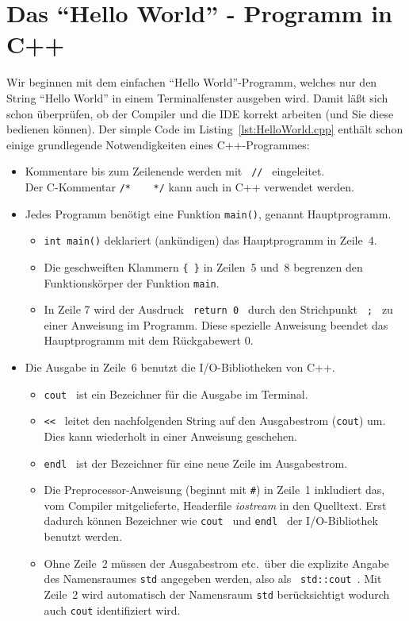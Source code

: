\section{Das ``Hello World'' - Programm in C++}
\label{p:1.2}
%
Wir beginnen mit dem einfachen ``Hello World''-Programm, welches
nur den String ``Hello World'' in einem Terminalfenster ausgeben wird. Damit läßt sich
schon überprüfen, ob der Compiler und die IDE korrekt arbeiten
(und Sie diese bedienen können).
%
%
Der simple Code im Listing~\ref{lst:HelloWorld.cpp} enthält schon einige
grundlegende Notwendigkeiten eines C++-Programmes:
%
\begin{itemize}
  \item Kommentare bis zum Zeilenende werden mit \verb| // | eingeleitet.
  \\
  Der C-Kommentar \verb|/*    */| kann auch in C++ verwendet werden.
  \item Jedes Programm benötigt eine Funktion \verb|main()|, genannt Hauptprogramm.
  \begin{itemize}
	  \item \verb|int main()|  deklariert (ankündigen) das Hauptprogramm in Zeile~4.
	  \item Die geschweiften Klammern \verb|{ }| in Zeilen~5 und~8 begrenzen den
	  Funktionskörper der Funktion \verb|main|.
	  \item In Zeile 7 wird der Ausdruck \verb| return 0 |
	  durch den Strichpunkt \verb| ; | zu einer Anweisung
	  im Programm. Diese spezielle Anweisung beendet das Hauptprogramm
	  mit dem Rückgabewert 0.
  \end{itemize}
  \item Die Ausgabe in Zeile~6 benutzt die I/O-Bibliotheken von C++.
  \begin{itemize}
    \item \verb|cout | ist ein Bezeichner für die Ausgabe im Terminal.
    \item \verb|<< |  leitet den nachfolgenden String auf den Ausgabestrom (\verb|cout|) um.
      Dies kann wiederholt in einer Anweisung geschehen.
    \item \verb|endl |  ist der Bezeichner für eine neue Zeile im Ausgabestrom.
    \item Die Preprocessor-Anweisung (beginnt mit \verb|#|) in Zeile~1 inkludiert
      das, vom Compiler mitgelieferte, Headerfile \emph{iostream}
      in den Quelltext. Erst dadurch können Bezeichner wie \verb|cout | und
       \verb|endl | der I/O-Bibliothek benutzt werden.
    \item Ohne Zeile~2 müssen der Ausgabestrom etc.\   über die explizite Angabe
    des Namensraumes \verb|std| angegeben werden, also als \verb| std::cout |.
    Mit Zeile~2 wird automatisch der Namensraum \verb|std| berücksichtigt wodurch
    auch \verb|cout|  identifiziert wird.
  \end{itemize}
\end{itemize}
%

